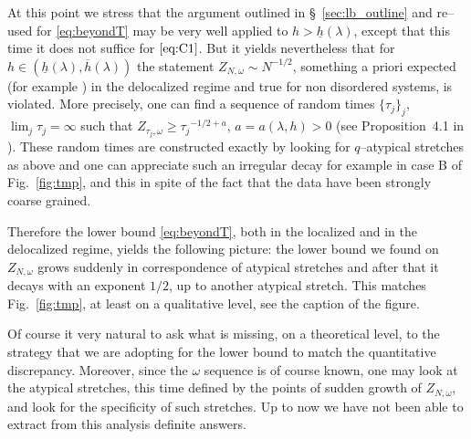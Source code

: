 \documentclass[reqno,11pt]{amsart}
\numberwithin{equation}{section}
\newcommand{\go}{\omega}
\newcommand{\gl}{\lambda}
\begin{document}
At this point we stress that the argument outlined in \S~\ref{sec:lb_outline}
and re--used for \eqref{eq:beyondT}
may be very well applied to $h> \underline{h}(\gl)$, except that
this time it does not suffice for $\eqref{eq:C1}$.
But it yields nevertheless  that for $h \in \left(\underline{h}(\gl), \overline{h}(\gl)\right)$
the statement $Z_{N,\go}\sim N^{-1/2}$, something a priori expected (for
example \cite{cf:BH})  
in the delocalized regime and true for non disordered systems, is
violated. More precisely, one can find a sequence of random
times $\{\tau_j\}_j$, $\lim_j \tau _j= \infty$ such that
$Z_{\tau_j,\go}\ge {\tau_j}^{-1/2+a}$, $a=a(\gl,h)>0$ (see  Proposition~4.1 in \cite{cf:GT}).
These random times are constructed exactly by looking
for $q$--atypical stretches as above and one can appreciate
such an irregular decay for example in case B of Fig.~\ref{fig:tmp},
and this in spite of the fact that the data have been  strongly coarse grained.

\smallskip

Therefore the lower bound
\eqref{eq:beyondT}, both in the localized and in the delocalized regime,
yields the following  picture:
the lower bound we found on  $Z_{N, \go}$ grows suddenly in correspondence of atypical stretches
and after that it decays with an exponent $1/2$, up to another atypical stretch.
This matches Fig.~\ref{fig:tmp}, at least on a qualitative level, see the caption
of the figure.


Of course it very natural to ask what is missing, on a theoretical
level, to the strategy that we are adopting for the lower bound to
match the quantitative discrepancy. Moreover,
since the $\go$ sequence is of course known, 
one may look at the atypical stretches, this time
defined by the points of sudden growth of  $Z_{N, \go}$,
and look for the specificity of such stretches.
Up to now we have not been able to extract from 
this analysis definite answers.



\end{document}
